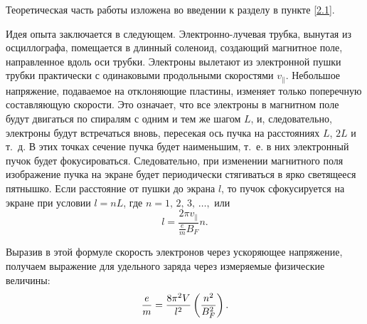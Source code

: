 



Теоретическая часть работы изложена во введении к разделу в пункте \ref{2.1}.%

Идея опыта заключается в следующем. Электронно-лучевая трубка, вынутая из осциллографа, помещается в длинный соленоид, создающий магнитное поле, направленное вдоль оси трубки. Электроны вылетают из электронной пушки трубки практически с одинаковыми продольными скоростями $v_{\parallel}$. Небольшое напряжение, подаваемое на отклоняющие пластины, изменяет только поперечную составляющую скорости. Это означает, что все электроны в магнитном поле будут двигаться по спиралям с одним и тем же шагом $L$, и, следовательно, электроны будут встречаться вновь, пересекая ось пучка на расстояниях $L$, $2L$ и т.~д. В этих точках сечение пучка будет наименьшим, т.~е. в них электронный пучок будет фокусироваться. Следовательно, при изменении магнитного поля изображение пучка на экране будет периодически стягиваться в ярко светящееся пятнышко. Если расстояние от пушки до экрана $l$, то пучок сфокусируется на экране при условии
$l=nL$, где $n=1,\, 2,\, 3,\, \ldots,$ или
\begin{equation*}
	l=\frac{2\pi v_{\parallel}}{\frac{e}{m} B_F}n.
\end{equation*}

Выразив в этой формуле скорость электронов через ускоряющее напряжение, получаем выражение для удельного заряда через измеряемые физические величины:
\begin{equation}
	\frac{e}{m}=\frac{8\pi^2V}{l^2}\left(\frac{n^2}{B_F^2}\right).
	\eqmark{3.1.1}
\end{equation}

